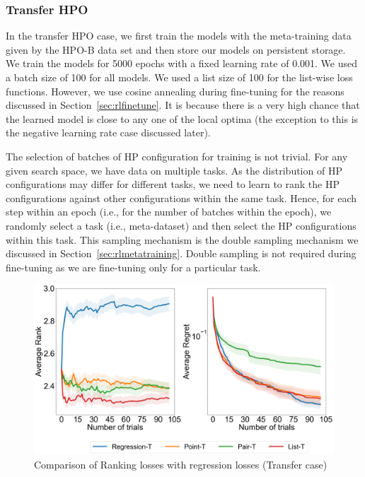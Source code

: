 \documentclass[12pt, twoside, ngerman]{report}
\begin{document}
\subsubsection{Transfer HPO}
In the transfer HPO case,  we first train the models with the meta-training data given by the HPO-B data set and then store our models on persistent storage.
We train the models for 5000 epochs with a fixed learning rate of 0.001.
We used a batch size of 100 for all models. We used a list size of 100 for the list-wise loss functions.
However, we use cosine annealing during fine-tuning for the reasons discussed in Section~\ref{sec:rlfinetune}.
It is because there is a very high chance that the learned model is close to any one of the local optima (the exception to this is the negative learning rate case discussed later).

The selection of batches of HP configuration for training is not trivial.
For any given search space,  we have data on multiple tasks.
As the distribution of HP configurations may differ for different tasks, we need to learn to rank the HP configurations against other configurations within the same task.
Hence, for each step within an epoch (i.e., for the number of batches within the epoch),  we randomly select a task (i.e., meta-dataset) and then select the HP configurations within this task.
This sampling mechanism is the double sampling mechanism we discussed in Section~\ref{sec:rlmetatraining}.
Double sampling is not required during fine-tuning as we are fine-tuning only for a particular task.

\begin{figure}[h]
  \centering
    \includegraphics[scale=0.25]{images/Q1AblationTransfer}
    \caption{Comparison of Ranking losses with regression losses (Transfer case)}
    \label{fig:Q1AblationTransfer}
\end{figure}
\end{document}
